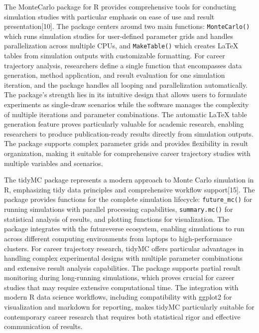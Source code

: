 \documentclass[main.tex]{subfiles}
\begin{document}

The MonteCarlo package for R provides comprehensive tools for conducting simulation studies with particular emphasis on ease of use and result presentation[10]. The package centers around two main functions: \texttt{MonteCarlo()} which runs simulation studies for user-defined parameter grids and handles parallelization across multiple CPUs, and \texttt{MakeTable()} which creates LaTeX tables from simulation outputs with customizable formatting. For career trajectory analysis, researchers define a single function that encompasses data generation, method application, and result evaluation for one simulation iteration, and the package handles all looping and parallelization automatically. The package's strength lies in its intuitive design that allows users to formulate experiments as single-draw scenarios while the software manages the complexity of multiple iterations and parameter combinations. The automatic LaTeX table generation feature proves particularly valuable for academic research, enabling researchers to produce publication-ready results directly from simulation outputs. The package supports complex parameter grids and provides flexibility in result organization, making it suitable for comprehensive career trajectory studies with multiple variables and scenarios.


The tidyMC package represents a modern approach to Monte Carlo simulation in R, emphasizing tidy data principles and comprehensive workflow support[15]. The package provides functions for the complete simulation lifecycle: \texttt{future\_mc()} for running simulations with parallel processing capabilities, \texttt{summary.mc()} for statistical analysis of results, and plotting functions for visualization. The package integrates with the futureverse ecosystem, enabling simulations to run across different computing environments from laptops to high-performance clusters. For career trajectory research, tidyMC offers particular advantages in handling complex experimental designs with multiple parameter combinations and extensive result analysis capabilities. The package supports partial result monitoring during long-running simulations, which proves crucial for career studies that may require extensive computational time. The integration with modern R data science workflows, including compatibility with ggplot2 for visualization and markdown for reporting, makes tidyMC particularly suitable for contemporary career research that requires both statistical rigor and effective communication of results.
\end{document}
